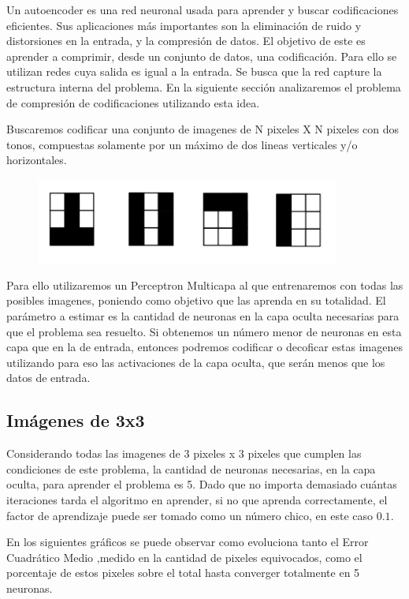 \documentclass[12pt]{article}
\begin{document}
Un autoencoder es una red neuronal usada para aprender y buscar codificaciones eficientes. Sus aplicaciones más importantes son la eliminación de ruido y distorsiones en la entrada, y la compresión de datos. El objetivo de este es aprender a comprimir, desde un conjunto de datos, una codificación. Para ello se utilizan redes cuya salida es igual a la entrada. Se busca que la red capture la estructura interna del problema. En la siguiente sección analizaremos el problema de compresión de codificaciones utilizando esta idea.

Buscaremos codificar una conjunto de imagenes de N pixeles X N pixeles con dos tonos, compuestas solamente por un máximo de dos lineas verticales y/o horizontales.

  \begin{figure}[!ht]
    \centering
    \includegraphics[width=10cm]{ejemplo}
  \end{figure}

Para ello utilizaremos un Perceptron Multicapa al que entrenaremos con todas las posibles imagenes, poniendo como objetivo que las aprenda en su totalidad. El parámetro a estimar es la cantidad de neuronas en la capa oculta necesarias para que el problema sea resuelto. Si obtenemos un número menor de neuronas en esta capa que en la de entrada, entonces podremos codificar o decoficar estas imagenes utilizando para eso las activaciones de la capa oculta, que serán menos que los datos de entrada.

\subsection{Im\'agenes de 3x3}

Considerando todas las imagenes de 3 pixeles x 3 pixeles que cumplen las condiciones de este problema, la cantidad de neuronas necesarias, en la capa oculta, para aprender el problema es 5. Dado que no importa demasiado cu\'antas iteraciones tarda el algoritmo en aprender, si no que aprenda correctamente, el factor de aprendizaje puede ser tomado como un número chico, en este caso $0.1$.

En los siguientes gráficos se puede observar como evoluciona tanto el Error Cuadrático Medio ,medido en la cantidad de pixeles equivocados, como el porcentaje de estos pixeles sobre el total hasta converger totalmente en 5 neuronas.
\end{document}
